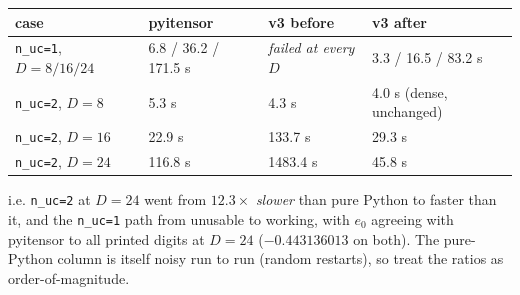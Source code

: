 \documentclass[11pt]{article}
\begin{document}
\begin{center}
\begin{tabular}{llll}
\hline
case & pyitensor & v3 before & v3 after \\
\hline
\texttt{n\_uc=1}, $D=8/16/24$ & 6.8 / 36.2 / 171.5 s & \emph{failed at every $D$} & 3.3 / 16.5 / 83.2 s \\
\texttt{n\_uc=2}, $D=8$ & 5.3 s & 4.3 s & 4.0 s (dense, unchanged) \\
\texttt{n\_uc=2}, $D=16$ & 22.9 s & 133.7 s & 29.3 s \\
\texttt{n\_uc=2}, $D=24$ & 116.8 s & 1483.4 s & 45.8 s \\
\hline
\end{tabular}
\end{center}

i.e. \texttt{n\_uc=2} at $D=24$ went from $12.3\times$ \emph{slower} than
pure Python to faster than it, and the \texttt{n\_uc=1} path from unusable to
working, with $e_0$ agreeing with pyitensor to all printed digits at $D=24$
($-0.443136013$ on both). The pure-Python column is itself noisy run to run
(random restarts), so treat the ratios as order-of-magnitude.
\end{document}
